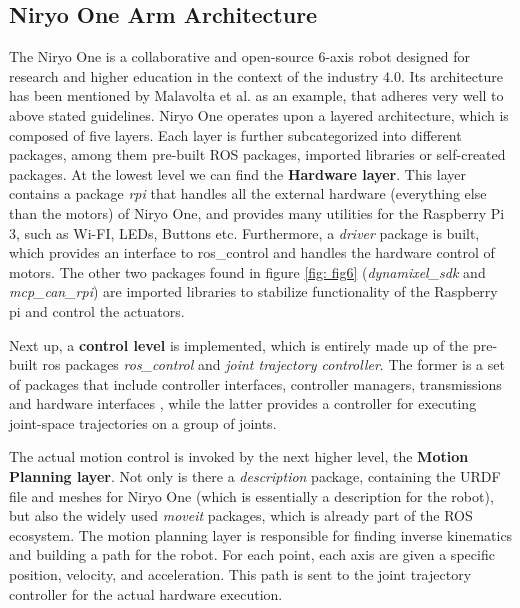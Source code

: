 \documentclass[]{article}
\begin{document}
	\subsection{Niryo One Arm Architecture}
	The Niryo One is a collaborative and open-source 6-axis robot designed for research and higher education in the context of the industry 4.0.
	Its architecture has been mentioned by Malavolta et al. as an example, that adheres very well to above stated guidelines. \autocite{malavoltaHowYouArchitect2020} Niryo One operates upon a layered architecture, which is composed of five layers. Each layer is further subcategorized into different packages, among them pre-built ROS packages, imported libraries or self-created packages. \newline
	At the lowest level we can find the \textbf{Hardware layer}. This layer contains a package \textit{rpi} that handles all the external hardware (everything else than the motors) of Niryo One, and provides many utilities for the Raspberry Pi 3, such as Wi-FI, LEDs, Buttons etc. Furthermore, a \textit{driver} package is built, which provides an interface to ros\_control and handles the hardware control of motors. The other two packages found in figure \ref{fig: fig6} (\textit{dynamixel\_sdk} and \textit{mcp\_can\_rpi}) are imported libraries to stabilize functionality of the Raspberry pi and control the actuators. \autocite{roboticsNiryoOneROS2024} \newline
	
	Next up, a \textbf{control level} is implemented, which is entirely made up of the pre-built ros packages \textit{ros\_control} and \textit{joint trajectory controller}. The former is a set of packages that include controller interfaces, controller managers, transmissions and hardware interfaces \autocite{ros.orgROSControl2024a}, while the latter provides a controller for executing joint-space trajectories on a group of joints. \autocite{ros.orgJointTrajectoryController2024} \newline
	
	The actual motion control is invoked by the next higher level, the \textbf{Motion Planning layer}. Not only is there a \textit{description} package, containing the URDF file and meshes for Niryo One (which is essentially a description for the robot), but also the widely used \textit{moveit} packages, which is already part of the ROS ecosystem. The motion planning layer is responsible for finding inverse kinematics and building a path for the robot.\autocite{roboticsGetStartedNiryo2024,ros.orgMoveItConcepts2024} For each point, each axis are given a specific position, velocity, and acceleration. This path is sent to the joint trajectory controller for the actual hardware execution. \autocite{roboticsGetStartedNiryo2024}
	
\end{document}
